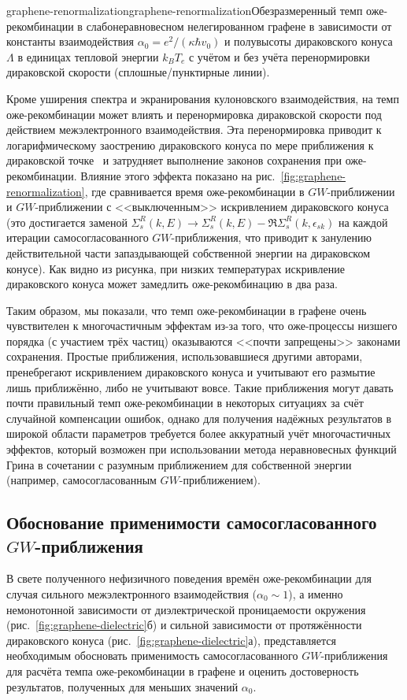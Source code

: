 \begin{narrowfig}{graphene-renormalization}{graphene-renormalization}Обезразмеренный темп оже-рекомбинации в слабонеравновесном нелегированном графене в зависимости от константы взаимодействия $\alpha_0 = e^2/(\kappa \hbar v_0)$ и полувысоты дираковского конуса $\Lambda$ в единицах тепловой энергии $k_B T_e$ с учётом и без учёта перенормировки дираковской скорости (сплошные/пунктирные линии).
\end{narrowfig}

Кроме уширения спектра и экранирования кулоновского взаимодействия, на темп оже-рекомбинации может влиять и перенормировка дираковской скорости под действием межэлектронного взаимодействия. Эта перенормировка приводит к логарифмическому заострению дираковского конуса по мере приближения к дираковской точке~\cite{velocity_renormalization} и затрудняет выполнение законов сохранения при оже-рекомбинации. Влияние этого эффекта показано на рис.~\ref{fig:graphene-renormalization}, где сравнивается время оже-рекомбинации в $GW$-приближении и $GW$-приближении с <<выключенным>> искривлением дираковского конуса (это достигается заменой $\Sigma_s^R(k,E) \rightarrow \Sigma_s^R(k,E) - \Re \Sigma_s^R(k,\epsilon_{sk})$ на каждой итерации самосогласованного $GW$-приближения, что приводит к занулению действительной части запаздывающей собственной энергии на дираковском конусе). Как видно из рисунка, при низких температурах искривление дираковского конуса может замедлить оже-рекомбинацию в два раза.

Таким образом, мы показали, что темп оже-рекомбинации в графене очень чувствителен к многочастичным эффектам из-за того, что оже-процессы низшего порядка (с участием трёх частиц) оказываются <<почти запрещены>> законами сохранения. Простые приближения, использовавшиеся другими авторами, пренебрегают искривлением дираковского конуса и учитывают его размытие лишь приближённо, либо не учитывают вовсе. Такие приближения могут давать почти правильный темп оже-рекомбинации в некоторых ситуациях за счёт случайной компенсации ошибок, однако для получения надёжных результатов в широкой области параметров требуется более аккуратный учёт многочастичных эффектов, который возможен при использовании метода неравновесных функций Грина в сочетании с разумным приближением для собственной энергии (например, самосогласованным $GW$-приближением).

\subsection{Обоснование применимости самосогласованного $GW$-приближения} \label{sec:graphene-GW_justification}
В свете полученного нефизичного поведения времён оже-рекомбинации для случая сильного межэлектронного взаимодействия ($\alpha_0 \sim 1$), а именно немонотонной зависимости от диэлектрической проницаемости окружения (рис.~\ref{fig:graphene-dielectric}б) и сильной зависимости от протяжённости дираковского конуса (рис.~\ref{fig:graphene-dielectric}а), представляется необходимым обосновать применимость самосогласованного $GW$-приближения для расчёта темпа оже-рекомбинации в графене и оценить достоверность результатов, полученных для меньших значений $\alpha_0$.

